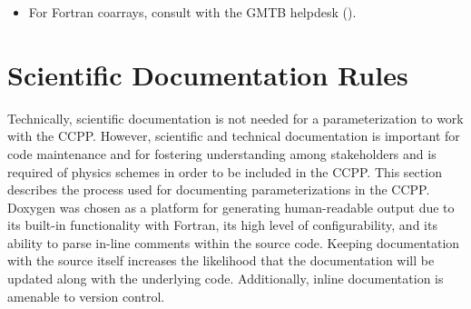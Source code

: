 \documentclass[letterpaper,10pt,english]{sphinxmanual}
\begin{document}
\begin{sphinxVerbatim}[commandchars=\\\{\}]
   

    
    
\end{sphinxVerbatim}
\begin{itemize}
\item {} 
For Fortran coarrays, consult with the GMTB helpdesk ().

\end{itemize}




\chapter{Scientific Documentation Rules}
\label{\detokenize{ScientificDocRules:scientific-documentation-rules}}\label{\detokenize{ScientificDocRules:scientificdocrules}}\label{\detokenize{ScientificDocRules::doc}}
Technically, scientific documentation is not needed for a parameterization
to work with the CCPP. However, scientific and technical documentation is
important for code maintenance and for fostering understanding among stakeholders
and is required of physics schemes in order to be included in the CCPP. This
section describes the process used for documenting parameterizations in the CCPP.
Doxygen was chosen as a platform for generating human-readable output due to its
built-in functionality with Fortran, its high level of configurability, and its
ability to parse in-line comments within the source code. Keeping documentation
with the source itself increases the likelihood that the documentation will be
updated along with the underlying code. Additionally, inline documentation is
amenable to version control.
\end{document}
